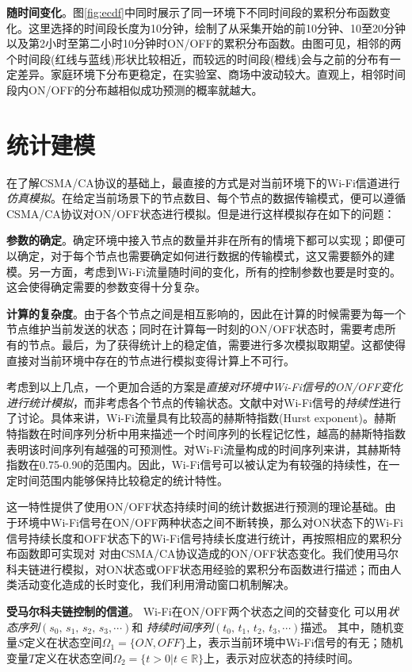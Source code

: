 \textbf{随时间变化}。图\ref{fig:ecdf}中同时展示了同一环境下不同时间段的累积分布函数变化。这里选择的时间段长度为10分钟，绘制了从采集开始的前10分钟、10至20分钟以及第2小时至第二小时10分钟时ON/OFF的累积分布函数。由图可见，相邻的两个时间段(红线与蓝线)形状比较相近，而较远的时间段(橙线)会与之前的分布有一定差异。家庭环境下分布更稳定，在实验室、商场中波动较大。直观上，相邻时间段内ON/OFF的分布越相似成功预测的概率就越大。
\section{统计建模}
\label{sec:model}
在了解CSMA/CA协议的基础上，最直接的方式是对当前环境下的Wi-Fi信道进行\emph{仿真模拟}。在给定当前场景下的节点数目、每个节点的数据传输模式，便可以遵循CSMA/CA协议对ON/OFF状态进行模拟。但是进行这样模拟存在如下的问题：

\textbf{参数的确定}。确定环境中接入节点的数量并非在所有的情境下都可以实现；即便可以确定，对于每个节点也需要确定如何进行数据的传输模式，这又需要额外的建模。另一方面，考虑到Wi-Fi流量随时间的变化，所有的控制参数也要是时变的。这会使得确定需要的参数变得十分复杂。

\textbf{计算的复杂度}。由于各个节点之间是相互影响的，因此在计算的时候需要为每一个节点维护当前发送的状态；同时在计算每一时刻的ON/OFF状态时，需要考虑所有的节点。最后，为了获得统计上的稳定值，需要进行多次模拟取期望。这都使得直接对当前环境中存在的节点进行模拟变得计算上不可行。

考虑到以上几点，一个更加合适的方案是\emph{直接对环境中Wi-Fi信号的ON/OFF变化进行统计模拟}，而非考虑各个节点的传输状态。文献\cite{yamkhin2009modeling}中对Wi-Fi信号的\emph{持续性}进行了讨论。具体来讲，Wi-Fi流量具有比较高的赫斯特指数(Hurst exponent)。赫斯特指数在时间序列分析中用来描述一个时间序列的长程记忆性，越高的赫斯特指数表明该时间序列有越强的可预测性。对Wi-Fi流量构成的时间序列来讲，其赫斯特指数在0.75-0.90的范围内。因此，Wi-Fi信号可以被认定为有较强的持续性，在一定时间范围内能够保持比较稳定的统计特性。

这一特性提供了使用ON/OFF状态持续时间的统计数据进行预测的理论基础。由于环境中Wi-Fi信号在ON/OFF两种状态之间不断转换，那么对ON状态下的Wi-Fi信号持续长度和OFF状态下的Wi-Fi信号持续长度进行统计，再按照相应的累积分布函数即可实现对
对由CSMA/CA协议造成的ON/OFF状态变化。我们使用马尔科夫链进行模拟，对ON状态或OFF状态用经验的累积分布函数进行描述；而由人类活动变化造成的长时变化，我们利用滑动窗口机制解决。

\textbf{受马尔科夫链控制的信道}。
Wi-Fi在ON/OFF两个状态之间的交替变化
可以用\emph{状态序列}$(s_0, \,  s_1, \, s_2 , \, s_3, \cdots)$和
\emph{持续时间序列}$(t_{0}, \, t_{1}, \, t_{2}, \, t_{3}, \cdots)$描述。
其中，随机变量$S$定义在状态空间$\Omega_1 = \{ON,OFF\}$上，表示当前环境中Wi-Fi信号的有无；随机变量$T$定义在状态空间$\Omega_2 = \{t > 0 | t \in \mathbb{R}\}$上，表示对应状态的持续时间。

